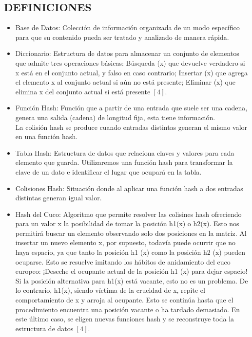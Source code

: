 \documentclass[final,a4paper,twocolumn,romanappendices]{IEEEtran}
\begin{document}
\subsection{DEFINICIONES}
\begin{itemize}
    \item Base de Datos: Colecci\'on de informaci\'on organizada de un modo espec\'ifico para que su contenido pueda ser tratado y analizado de manera r\'apida.
    \item Diccionario: Estructura de datos para almacenar un conjunto de elementos que admite tres operaciones b\'asicas: B\'usqueda (x) que devuelve verdadero si x est\'a en el conjunto actual, y falso en caso contrario; Insertar (x) que agrega el elemento x al conjunto actual si a\'un no est\'a presente; Eliminar (x) que elimina x del conjunto actual si est\'a presente $[4]$.
    \item Función Hash: Función que a partir de una entrada que suele ser una cadena, genera una salida (cadena) de longitud fija, esta tiene información.\\
La colisión hash se produce cuando entradas distintas generan el mismo valor en una función hash.
    \item Tabla Hash: Estructura de datos que relaciona claves y valores para cada elemento que guarda. Utilizaremos una función hash para transformar la clave de un dato e identificar el lugar que ocupará en la tabla.
    \item Colisiones Hash: Situación donde al aplicar una función hash a dos entradas distintas generan igual valor.
    \item Hash del Cuco: Algoritmo que permite resolver las colisines hash ofreciendo para un valor x la posibilidad de tomar la posici\'on h1(x) o h2(x). Esto nos permitir\'a buscar un elemento observando solo dos posiciones en la matriz. Al insertar un nuevo elemento x, por supuesto, todav\'ia puede ocurrir que no haya espacio, ya que tanto la posici\'on h1 (x) como la posici\'on h2 (x) pueden ocuparse. Esto se resuelve imitando los h\'abitos de anidamiento del cuco europeo: ¡Deseche el ocupante actual de la posici\'on h1 (x) para dejar espacio! Si la posici\'on alternativa para h1(x) est\'a vacante, esto no es un problema. De lo contrario, h1(x), siendo v\'ictima de la crueldad de x, repite el comportamiento de x y arroja al ocupante. Esto se continúa hasta que el procedimiento encuentra una posici\'on vacante o ha tardado demasiado. En este \'ultimo caso, se eligen nuevas funciones hash y se reconstruye toda la estructura de datos $[4]$.
\end{itemize}
\end{document}
